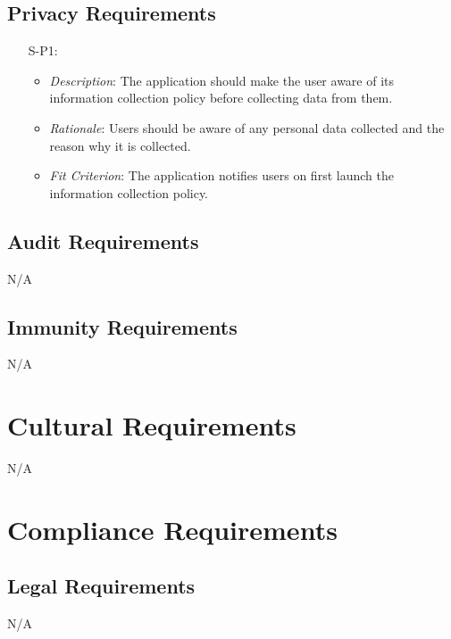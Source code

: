 \documentclass[12pt]{article}
\begin{document}
\subsection{Privacy Requirements}
\noindent \begin{itemize}
    \item[S-P1:] 
        \begin{itemize}
            \item \textit{Description}: The application should make the user aware of its information collection policy before collecting data from them.
            \item \textit{Rationale}: Users should be aware of any personal data collected and the reason why it is collected.
            \item \textit{Fit Criterion}: The application notifies users on first launch the information collection policy.
        \end{itemize}
\end{itemize}

\subsection{Audit Requirements}
N/A
\subsection{Immunity Requirements}
N/A

\section{Cultural Requirements}

N/A


\section{Compliance Requirements}
\subsection{Legal Requirements}
N/A
\end{document}
